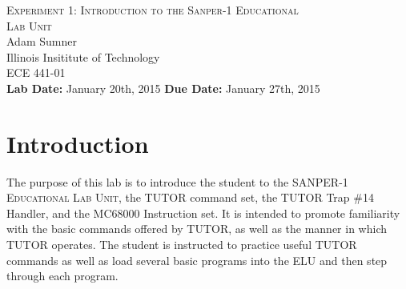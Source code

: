 \documentclass[12pt, twocolumn]{article}
\begin{document}
\begin{titlepage}
	\begin{center}
		
		
		\vfill
		
		\textsc{\LARGE Experiment 1: Introduction to the Sanper-1 Educational \\ Lab Unit}\\[1.5cm]
		
		\Large Adam Sumner\\[0.5cm]
		
		\Large Illinois Insititute of Technology\\[0.5cm]
		
		\Large ECE 441-01\\[0.5cm]	
		\noindent
		\vfill
		\large \textbf{Lab Date:} January 20th, 2015\hfill
		\large \textbf{Due Date:} January 27th, 2015
		
		
	\end{center}
\end{titlepage}

\section{Introduction}
The purpose of this lab is to introduce the student to the \textsc{SANPER-1 Educational Lab Unit}, the \textsc{TUTOR} command set, the \textsc{TUTOR} Trap \#14 Handler, and the MC68000 Instruction set. It is intended to promote familiarity with the basic commands offered by \textsc{TUTOR}, as well as the manner in which \textsc{TUTOR} operates. The student is instructed to practice useful \textsc{TUTOR} commands as well as load several basic programs into the \textsc{ELU} and then step through each program.
\end{document}
